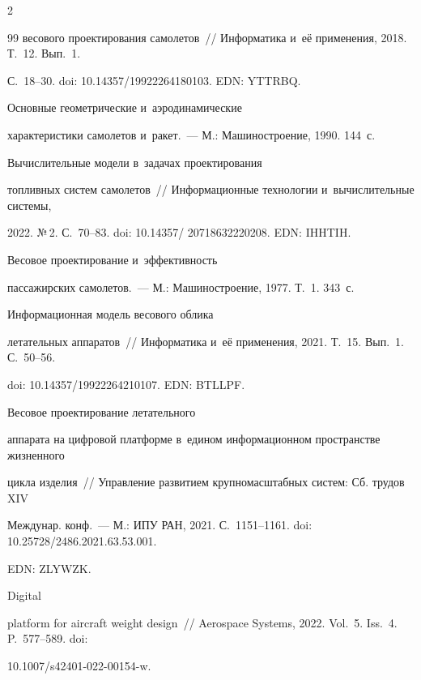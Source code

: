 \begin{multicols}{2}
{{\begin{thebibliography}{99}
весового проектирования самолетов~// Информатика и~её применения, 2018. Т.~12. Вып.~1. 


С.~18--30. doi: 10.14357/19922264180103.  EDN: YTTRBQ.




 Основные геометрические и~аэродинамические 


характеристики самолетов и~ракет.~--- М.: Машиностроение, 1990. 144~с.




 Вычислительные модели в~задачах проектирования 


топливных систем самолетов~// Информационные технологии и~вычислительные системы, 


2022. №\,2. С.~70--83. doi: 10.14357/ 20718632220208. EDN: IHHTIH.




 Весовое проектирование и~эффективность 


пассажирских самолетов.~---  М.: Машиностроение, 1977. Т.~1. 343~с.




 Информационная модель весового облика 


летательных аппаратов~// Информатика и~её применения, 2021. Т.~15. Вып.~1. С.~50--56. 


doi: 10.14357/19922264210107. EDN: BTLLPF.




 Весовое проектирование летательного 


аппарата на цифровой платформе в~едином информационном пространстве жизненного 


цикла изделия~// Управ\-ле\-ние развитием крупномасштабных систем: Сб. трудов XIV 


Междунар. конф.~--- М.: ИПУ РАН, 2021. С.~1151--1161. doi: 10.25728/2486.2021.63.53.001. 


EDN: ZLYWZK.




 Digital 


platform for aircraft weight design~// Aerospace Systems, 2022. Vol.~5. Iss.~4. P.~577--589. doi: 


10.1007/s42401-022-00154-w.



\end{thebibliography}}}
\end{multicols}
